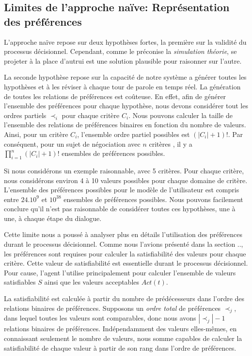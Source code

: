 		\subsection{Limites de l'approche naïve: Représentation des préférences}
			L'approche naïve repose sur deux hypothèses fortes, la première sur la validité du processus décisionnel. Cependant, comme le préconise la \emph{simulation théorie}, se projeter à la place d'autrui est une solution plausible pour raisonner sur l'autre.
			
			La seconde hypothèse repose sur la capacité de notre système a générer toutes les hypothèses et à les réviser à chaque tour de parole en temps réel. La génération de toutes les relations de préférences est coûteuse. En effet, afin de générer l'ensemble des préférences pour chaque hypothèse, nous devons considérer tout les ordres partiels $\prec_i$ pour chaque critère $C_i$.
			Nous pouvons calculer la taille de l'ensemble des relations de préférences binaires en fonction du nombre de valeurs. Ainsi, pour un critère $C_i$, l'ensemble ordre partiel possibles est  $(|C_i|+1)! $. Par conséquent, pour un sujet de négociation avec $n$ critères , il y a $\prod_{i=1}^n (|C_i|+1)!$ ensembles de préférences possibles.
			
			
			Si nous considérons un exemple raisonnable, avec 5 critères. Pour chaque critère, nous considérons environ 4 à 10 valeurs possibles pour chaque domaine de critère. L'ensemble des préférences possibles pour le modèle de l'utilisateur est compris entre $ 24.10 ^ 9 $ et $ 10 ^ {38} $ ensembles de préférences possibles.
			Nous pouvons facilement conclure qu'il n'est pas raisonnable de considérer toutes ces hypothèses, une à une, à chaque étape du dialogue.
			
			Cette limite nous a poussé à analyser plus en détails l'utilisation des préférences durant le processus décisionnel. Comme nous l'avions présenté dans la section .., les préférences sont requises pour calculer la satisfiabilité des valeurs pour chaque critère. Cette valeur de satisfiabilité est essentielle durant le processus décisionnel. Pour cause, l'agent l'utilise principalement pour calculer l'ensemble de valeurs satisfiables $S$ ainsi que les valeurs acceptables $Act(t)$.
			
			La satisfiabilité est calculée à partir du nombre de prédécesseurs dans l'ordre des relations binaires de préférences. 
			Supposons un \textit{ordre total} de préférences $\prec_j$, dans lequel toutes les valeurs sont comparables, donc nous avons $|\prec_j| -1$ relations binaires de préférences. Indépendamment des valeurs elles-mêmes, en connaissant seulement le nombre de valeurs, nous somme capables de calculer la satisfiabilité de chaque valeur à partir de son rang dans l'ordre de préférences.
			

